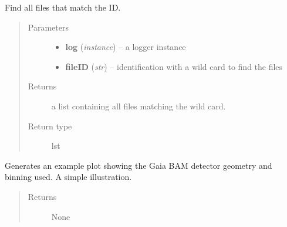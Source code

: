 \documentclass[a4paper,11pt,english]{sphinxmanual}
\begin{document}
\begin{fulllineitems}
\label{analysis:analysis.analyseGaiaBAMCosmicRayData.findFiles}
Find all files that match the ID.
\begin{quote}\begin{description}
\item[{Parameters}] \leavevmode\begin{itemize}
\item {} 
\textbf{log} (\emph{instance}) -- a logger instance

\item {} 
\textbf{fileID} (\emph{str}) -- identification with a wild card to find the files

\end{itemize}

\item[{Returns}] \leavevmode
a list containing all files matching the wild card.

\item[{Return type}] \leavevmode
lst

\end{description}\end{quote}

\end{fulllineitems}


\begin{fulllineitems}
\label{analysis:analysis.analyseGaiaBAMCosmicRayData.generateBAMdatagridImage}
Generates an example plot showing the Gaia BAM detector geometry
and binning used. A simple illustration.
\begin{quote}\begin{description}
\item[{Returns}] \leavevmode
None

\end{description}\end{quote}

\end{fulllineitems}

\end{document}

